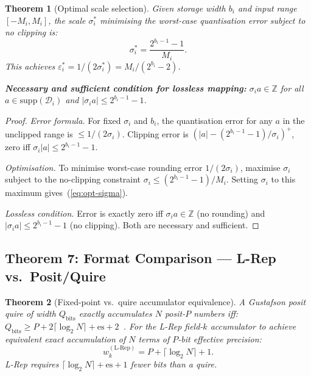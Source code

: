 \documentclass[11pt,a4paper]{article}
\theoremstyle{definition}
\theoremstyle{plain}
\newtheorem{theorem}{Theorem}[section]
\theoremstyle{remark}
\begin{document}
\begin{theorem}[Optimal scale selection]
\label{thm:quant}
Given storage width $b_i$ and input range $[-M_i, M_i]$, the scale
$\sigma_i^*$ minimising the worst-case quantisation error subject to
no clipping is:
\begin{equation}\label{eq:opt-sigma}
  \sigma_i^* = \frac{2^{b_i-1}-1}{M_i}.
\end{equation}
This achieves $\varepsilon_i^* = 1/(2\sigma_i^*) = M_i / (2^{b_i}-2)$.

\textbf{Necessary and sufficient condition for lossless mapping:}
$\sigma_i a \in \mathbb{Z}$ for all $a \in \mathrm{supp}(\mathcal{D}_i)$
and $|\sigma_i a| \le 2^{b_i-1}-1$.
\end{theorem}

\begin{proof}
\emph{Error formula.}
For fixed $\sigma_i$ and $b_i$, the quantisation error for any $a$ in
the unclipped range is $\le 1/(2\sigma_i)$.
Clipping error is $(|a| - (2^{b_i-1}-1)/\sigma_i)^+$, zero iff
$\sigma_i |a| \le 2^{b_i-1}-1$.

\emph{Optimisation.}
To minimise worst-case rounding error $1/(2\sigma_i)$, maximise
$\sigma_i$ subject to the no-clipping constraint
$\sigma_i \le (2^{b_i-1}-1)/M_i$.
Setting $\sigma_i$ to this maximum gives~(\ref{eq:opt-sigma}).

\emph{Lossless condition.}
Error is exactly zero iff $\sigma_i a \in \mathbb{Z}$ (no rounding)
and $|\sigma_i a| \le 2^{b_i-1}-1$ (no clipping).
Both are necessary and sufficient.
\end{proof}

\subsection{Theorem 7: Format Comparison --- L-Rep vs.\ Posit/Quire}
\label{sec:format}

\begin{theorem}[Fixed-point vs.\ quire accumulator equivalence]
\label{thm:format}
A Gustafson posit quire of width $Q_\mathrm{bits}$ exactly accumulates
$N$ posit-$P$ numbers iff:
$Q_\mathrm{bits} \ge P + 2\lceil\log_2 N\rceil + \mathrm{es} + 2$~\cite{gustafson2017}.
For the L-Rep field-$k$ accumulator to achieve equivalent exact
accumulation of $N$ terms of $P$-bit effective precision:
\begin{equation}\label{eq:quire-equiv}
  w_k^{(\mathrm{L\text{-}Rep})} = P + \lceil\log_2 N\rceil + 1.
\end{equation}
L-Rep requires $\lceil\log_2 N\rceil + \mathrm{es} + 1$ fewer bits
than a quire.
\end{theorem}
\end{document}
